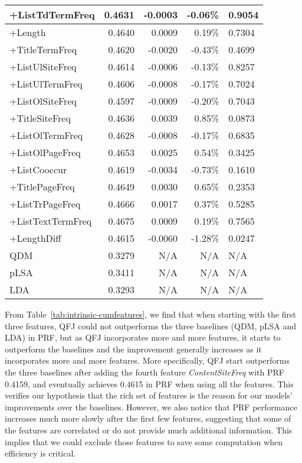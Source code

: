 \begin{table}[!htbp]
\begin{tabular}{|l|r|r|r|l|}
+ListTdTermFreq & 0.4631 & -0.0003 & -0.06\% & 0.9054 \\ \hline
+Length & 0.4640 & 0.0009 & 0.19\% & 0.7304 \\ \hline
+TitleTermFreq & 0.4620 & -0.0020 & -0.43\% & 0.4699 \\ \hline
+ListUlSiteFreq & 0.4614 & -0.0006 & -0.13\% & 0.8257 \\ \hline
+ListUlTermFreq & 0.4606 & -0.0008 & -0.17\% & 0.7024 \\ \hline
+ListOlSiteFreq & 0.4597 & -0.0009 & -0.20\% & 0.7043 \\ \hline
+TitleSiteFreq & 0.4636 & 0.0039 & 0.85\% & 0.0873 \\ \hline
+ListOlTermFreq & 0.4628 & -0.0008 & -0.17\% & 0.6835 \\ \hline
+ListOlPageFreq & 0.4653 & 0.0025 & 0.54\% & 0.3425 \\ \hline
+ListCooccur & 0.4619 & -0.0034 & -0.73\% & 0.1610 \\ \hline
+TitlePageFreq & 0.4649 & 0.0030 & 0.65\% & 0.2353 \\ \hline
+ListTrPageFreq & 0.4666 & 0.0017 & 0.37\% & 0.5285 \\ \hline
+ListTextTermFreq & 0.4675 & 0.0009 & 0.19\% & 0.7565 \\ \hline
+LengthDiff & 0.4615 & -0.0060 & -1.28\% & 0.0247 \\ \hhline{=====}
QDM & 0.3279 & N/A & N/A & N/A \\ \hline
pLSA & 0.3411 & N/A & N/A & N/A \\ \hline
LDA & 0.3293 & N/A & N/A & N/A \\ \hline
\end{tabular}
\end{table}

From Table~\ref{tab:intrinsic-cumfeatures}, we find that when starting with the first three features, QFJ could not outperforms the three baselines (QDM, pLSA and LDA) in PRF, but as QFJ incorporates more and more features, it starts to outperform the baselines and the improvement generally increases as it incorporates more and more features. More specifically, QFJ start outperforms the three baselines after adding the fourth feature \textit{ContentSiteFreq} with PRF 0.4159, and eventually achieves 0.4615 in PRF when using all the features. This verifies our hypothesis that the rich set of features is the reason for our models' improvements over the baselines. However, we also notice that PRF performance increases much more slowly after the first few features, suggesting that some of the features are correlated or do not provide much additional information. This implies that we could exclude those features to save some computation when efficiency is critical.



